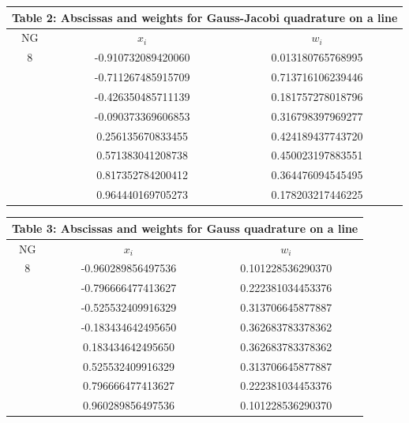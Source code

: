 \documentclass[12pt]{article}
\begin{document}
\begin{center}
\begin{tabular}{|c|c|c|}
\multicolumn{3}{c}{Table 2: Abscissas and weights for Gauss-Jacobi quadrature on a line}\\
\hline
NG & $x_i$ & $w_i$\\
\hline\hline
8 & -0.910732089420060 & 0.013180765768995\\
 & -0.711267485915709 & 0.713716106239446\\
 & -0.426350485711139 & 0.181757278018796\\
 & -0.090373369606853 & 0.316798397969277\\
 & 0.256135670833455 & 0.424189437743720\\
 & 0.571383041208738 & 0.450023197883551\\
 & 0.817352784200412 & 0.364476094545495\\
 & 0.964440169705273 & 0.178203217446225\\
\hline
\end{tabular}
\end{center}

\begin{center}
\begin{tabular}{|c|c|c|}
\multicolumn{3}{c}{Table 3: Abscissas and weights for Gauss quadrature on a line}\\
\hline
NG & $x_i$ & $w_i$\\
\hline\hline
8 & -0.960289856497536 & 0.101228536290370\\
 & -0.796666477413627 & 0.222381034453376\\
 & -0.525532409916329 & 0.313706645877887\\
 & -0.183434642495650 & 0.362683783378362\\
 & 0.183434642495650 & 0.362683783378362\\
 & 0.525532409916329 & 0.313706645877887\\
 & 0.796666477413627 & 0.222381034453376\\
 & 0.960289856497536 & 0.101228536290370\\
\hline
\end{tabular}
\end{center}
\end{document}
